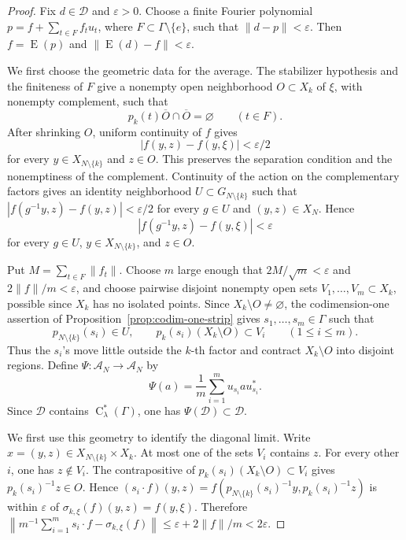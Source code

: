 \documentclass[11pt]{amsart}
\numberwithin{equation}{section}
\newcommand{\rC}{\operatorname{C}}
\newcommand{\rE}{\operatorname{E}}
\theoremstyle{definition}
\begin{document}
	\begin{proof}
		Fix \(d\in\mathcal D\) and \(\varepsilon>0\). Choose a finite Fourier polynomial \(p=f+\sum_{t\in F}f_tu_t\), where \(F\subset\Gamma\setminus\{e\}\), such that \(\|d-p\|<\varepsilon\). Then \(f=\rE(p)\) and \(\|\rE(d)-f\|<\varepsilon\).
		
		We first choose the geometric data for the average. The stabilizer hypothesis and the finiteness of \(F\) give a nonempty open neighborhood \(O\subset X_k\) of \(\xi\), with nonempty complement, such that
		\[
		p_k(t)\overline O\cap\overline O=\varnothing
		\qquad(t\in F).
		\]
		After shrinking \(O\), uniform continuity of \(f\) gives
		\[
		|f(y,z)-f(y,\xi)|<\varepsilon/2
		\]
		for every \(y\in X_{N\setminus\{k\}}\) and \(z\in O\). This preserves the separation condition and the nonemptiness of the complement. Continuity of the action on the complementary factors gives an identity neighborhood \(U\subset G_{N\setminus\{k\}}\) such that \(|f(g^{-1}y,z)-f(y,z)|<\varepsilon/2\) for every \(g\in U\) and \((y,z)\in X_N\). Hence
		\[
		|f(g^{-1}y,z)-f(y,\xi)|<\varepsilon
		\]
		for every \(g\in U\), \(y\in X_{N\setminus\{k\}}\), and \(z\in O\).
		
		Put \(M=\sum_{t\in F}\|f_t\|\). Choose \(m\) large enough that \(2M/\sqrt m<\varepsilon\) and \(2\|f\|/m<\varepsilon\), and choose pairwise disjoint nonempty open sets \(V_1,\ldots,V_m\subset X_k\), possible since \(X_k\) has no isolated points. Since \(X_k\setminus O\neq\varnothing\), the codimension-one assertion of Proposition~\ref{prop:codim-one-strip} gives \(s_1,\ldots,s_m\in\Gamma\) such that
		\[
		p_{N\setminus\{k\}}(s_i)\in U,
		\qquad
		p_k(s_i)(X_k\setminus O)\subset V_i
		\qquad(1\leq i\leq m).
		\]
		Thus the \(s_i\)'s move little outside the \(k\)-th factor and contract \(X_k\setminus O\) into disjoint regions. Define \(\Psi:\mathcal A_N\to\mathcal A_N\) by
		\[
		\Psi(a)=\frac1m\sum_{i=1}^m u_{s_i}au_{s_i}^*.
		\]
		Since \(\mathcal D\) contains \(\rC^*_\lambda(\Gamma)\), one has \(\Psi(\mathcal D)\subset\mathcal D\).
		
		We first use this geometry to identify the diagonal limit. Write \(x=(y,z)\in X_{N\setminus\{k\}}\times X_k\). At most one of the sets \(V_i\) contains \(z\). For every other \(i\), one has \(z\notin V_i\). The contrapositive of \(p_k(s_i)(X_k\setminus O)\subset V_i\) gives \(p_k(s_i)^{-1}z\in O\). Hence \((s_i\cdot f)(y,z)=f(p_{N\setminus\{k\}}(s_i)^{-1}y,p_k(s_i)^{-1}z)\) is within \(\varepsilon\) of \(\sigma_{k,\xi}(f)(y,z)=f(y,\xi)\). Therefore
		\(\left\|m^{-1}\sum_{i=1}^m s_i\cdot f-\sigma_{k,\xi}(f)\right\|
		\leq\varepsilon+2\|f\|/m<2\varepsilon\).
		

\end{proof}
\end{document}

